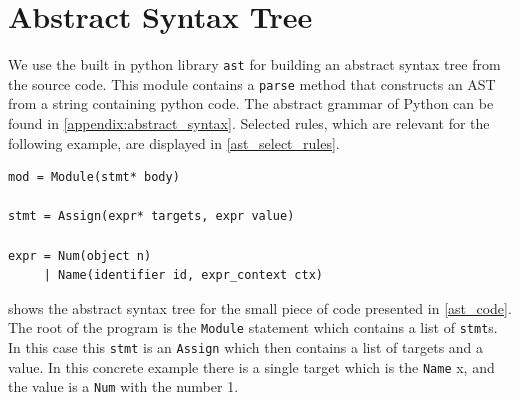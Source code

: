 \section{Abstract Syntax Tree}
We use the built in python library \texttt{ast} for building an abstract syntax tree from the source code.
This module contains a \texttt{parse} method that constructs an AST from a string containing python code.
The abstract grammar of Python can be found in \cref{appendix:abstract_syntax}.
Selected rules, which are relevant for the following example, are displayed in \cref{ast_select_rules}.

\begin{lstlisting}[style=default, caption={Selected rules from the python abstract grammar}, label={ast_select_rules}]
mod = Module(stmt* body)

stmt = Assign(expr* targets, expr value)

expr = Num(object n)
     | Name(identifier id, expr_context ctx)
\end{lstlisting}

 shows the abstract syntax tree for the small piece of code presented in \cref{ast_code}.
The root of the program is the \texttt{Module} statement which contains a list of \texttt{stmt}s.
In this case this \texttt{stmt} is an \texttt{Assign} which then contains a list of targets and a value.
In this concrete example there is a single target which is the \texttt{Name} x, and the value is a \texttt{Num} with the number 1.

